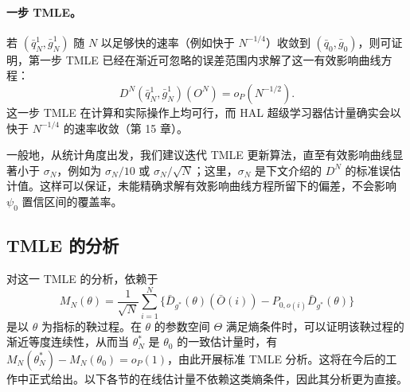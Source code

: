 \paragraph{一步 TMLE。}
若 $(\bar q_N^1,\bar g_N^1)$ 随 $N$ 以足够快的速率（例如快于 $N^{-1/4}$）收敛到 $(\bar q_0,\bar g_0)$，则可证明，第一步 TMLE 已经在渐近可忽略的误差范围内求解了这一有效影响曲线方程：
\[
 D^N(\bar q_N^1,\bar g_N^1)(O^N)=o_P(N^{-1/2}).
\]
这一步 TMLE 在计算和实际操作上均可行，而 HAL 超级学习器估计量确实会以快于 $N^{-1/4}$ 的速率收敛（第 15 章）。

一般地，从统计角度出发，我们建议迭代 TMLE 更新算法，直至有效影响曲线显著小于 $\sigma_N$，例如为 $\sigma_N/10$ 或 $\sigma_N/\sqrt N$；这里，$\sigma_N$ 是下文介绍的 $D^N$ 的标准误估计值。这样可以保证，未能精确求解有效影响曲线方程所留下的偏差，不会影响 $\psi_0$ 置信区间的覆盖率。

\subsection{TMLE 的分析}

对这一 TMLE 的分析，依赖于
\[
 M_N(\theta)=\frac1{\sqrt N}\sum_{i=1}^N
 \{\bar D_{g^*}(\theta)(\bar O(i))-P_{0,o(i)}\bar D_{g^*}(\theta)\}
\]
是以 $\theta$ 为指标的鞅过程。在 $\theta$ 的参数空间 $\Theta$ 满足熵条件时，可以证明该鞅过程的渐近等度连续性，从而当 $\theta_N^*$ 是 $\theta_0$ 的一致估计量时，有 $M_N(\theta_N^*)-M_N(\theta_0)=o_P(1)$，由此开展标准 TMLE 分析。这将在今后的工作中正式给出。以下各节的在线估计量不依赖这类熵条件，因此其分析更为直接。
